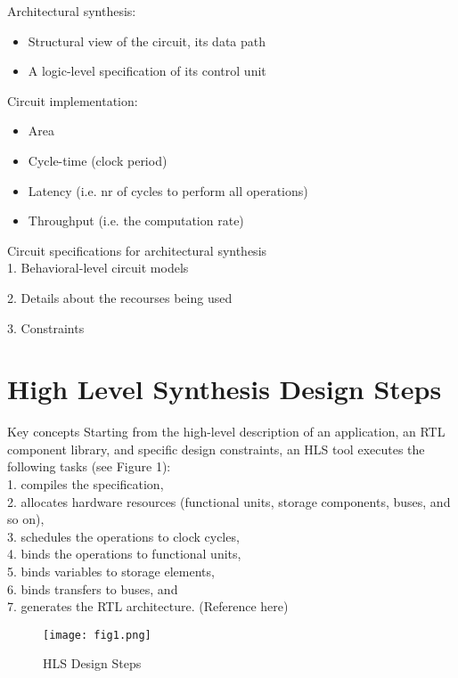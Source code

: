 \documentclass[conference]{IEEEtran}
\begin{document}
Architectural synthesis:

\begin{itemize}
  \item Structural view of the circuit, its data path
  \item A logic-level specification of its control unit\\
\end{itemize}

Circuit implementation:
\begin{itemize}

  \item Area
  \item Cycle-time (clock period)
  \item Latency (i.e. nr of cycles to perform all operations)
  \item Throughput (i.e. the computation rate)\\
\end{itemize}

Circuit specifications for architectural synthesis\\

1. Behavioral-level circuit models

2. Details about the recourses being used

3. Constraints
\section{High Level Synthesis Design Steps}
Key concepts
Starting from the high-level description of an application, an RTL component library, and specific design
constraints, an HLS tool executes the following tasks
(see Figure 1):\\
1. compiles the specification,\\
2. allocates hardware resources (functional units,
storage components, buses, and so on),\\
3. schedules the operations to clock cycles,\\
4. binds the operations to functional units,\\
5. binds variables to storage elements,\\
6. binds transfers to buses, and\\
7. generates the RTL architecture. (Reference here)

\begin{figure}[htbp]
\begin{center}
 \texttt{[image: fig1.png]}
\caption{HLS Design Steps}
\label{default}
\end{center}
\end{figure}
\end{document}
